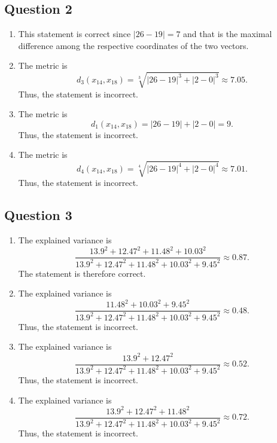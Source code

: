 \documentclass[twoside,11pt]{article}
\begin{document}
\subsection*{Question 2}

\begin{enumerate}[label=\Alph*.]
	\item This statement is correct since \(|26 - 19| = 7\) and that is the maximal difference among the respective coordinates of the two vectors.

	\item The metric is
	\[
		d_3(x_{14}, x_{18}) = \sqrt[3]{|26 - 19|^3 + |2 - 0|^3} \approx 7.05.
	\]
	Thus, the statement is incorrect.

	\item The metric is
	\[
		d_1(x_{14}, x_{18}) = |26 - 19| + |2 - 0| = 9.
	\]
	Thus, the statement is incorrect.

	\item The metric is
	\[
		d_4(x_{14}, x_{18}) = \sqrt[4]{|26 - 19|^4 + |2 - 0|^4} \approx 7.01.
	\]
	Thus, the statement is incorrect.

\end{enumerate}

\subsection*{Question 3}

\begin{enumerate}[label=\Alph*.]
	\item The explained variance is
	\[
		\frac{13.9^2 + 12.47^2 + 11.48^2 + 10.03^2}{13.9^2 + 12.47^2 + 11.48^2 + 10.03^2 + 9.45^2} \approx 0.87.
	\]
	The statement is therefore correct.

	\item The explained variance is
	\[
		\frac{11.48^2 + 10.03^2 + 9.45^2}{13.9^2 + 12.47^2 + 11.48^2 + 10.03^2 + 9.45^2} \approx 0.48.
	\]
	Thus, the statement is incorrect.

	\item The explained variance is
	\[
		\frac{13.9^2 + 12.47^2}{13.9^2 + 12.47^2 + 11.48^2 + 10.03^2 + 9.45^2} \approx 0.52.
	\]
	Thus, the statement is incorrect.

	\item The explained variance is
	\[
		\frac{13.9^2 + 12.47^2 + 11.48^2}{13.9^2 + 12.47^2 + 11.48^2 + 10.03^2 + 9.45^2} \approx 0.72.
	\]
	Thus, the statement is incorrect.

\end{enumerate}
\end{document}
